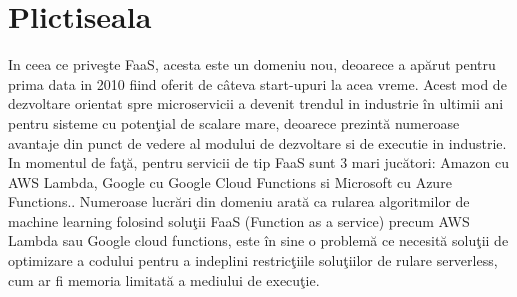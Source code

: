\documentclass[a4paper,12pt]{report}
\begin{document}
\chapter{Plictiseala}
In ceea ce priveşte FaaS, acesta este un domeniu nou, deoarece a apărut pentru prima data in 2010 fiind oferit de câteva start-upuri la acea vreme. Acest mod de dezvoltare orientat spre microservicii a devenit trendul in industrie în ultimii ani pentru sisteme cu potenţial de scalare mare, deoarece prezintă numeroase avantaje din punct de vedere al modului de dezvoltare si de executie in industrie. In momentul de faţă, pentru servicii de tip FaaS sunt 3 mari jucători: Amazon cu AWS Lambda, Google cu Google Cloud Functions si Microsoft cu Azure Functions.\cite{jonas2019cloud}. Numeroase lucrări din domeniu \cite{christidis2019, wang2019} arată ca rularea algoritmilor de machine learning folosind soluţii FaaS (Function as a service) precum AWS Lambda sau Google cloud functions, este în sine o problemă ce necesită soluţii de optimizare a codului pentru a indeplini restricţiile soluţiilor de rulare serverless, cum ar fi memoria limitată a mediului de execuţie. 
\blindtext[3]



\end{document}
